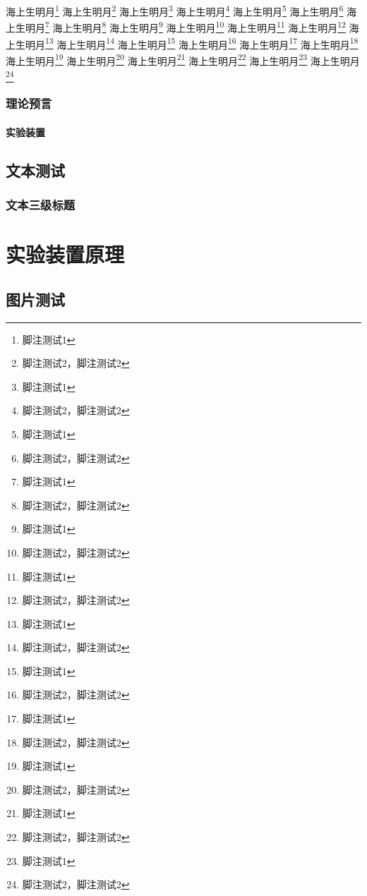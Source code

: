 \zhlipsum[2]
海上生明月\footnote{脚注测试1}
海上生明月\footnote{脚注测试2，脚注测试2}
海上生明月\footnote{脚注测试1}
海上生明月\footnote{脚注测试2，脚注测试2}
海上生明月\footnote{脚注测试1}
海上生明月\footnote{脚注测试2，脚注测试2}
海上生明月\footnote{脚注测试1}
海上生明月\footnote{脚注测试2，脚注测试2}
海上生明月\footnote{脚注测试1}
海上生明月\footnote{脚注测试2，脚注测试2}
海上生明月\footnote{脚注测试1}
海上生明月\footnote{脚注测试2，脚注测试2}
海上生明月\footnote{脚注测试1}
海上生明月\footnote{脚注测试2，脚注测试2}
海上生明月\footnote{脚注测试1}
海上生明月\footnote{脚注测试2，脚注测试2}
海上生明月\footnote{脚注测试1}
海上生明月\footnote{脚注测试2，脚注测试2}
海上生明月\footnote{脚注测试1}
海上生明月\footnote{脚注测试2，脚注测试2}
海上生明月\footnote{脚注测试1}
海上生明月\footnote{脚注测试2，脚注测试2}
海上生明月\footnote{脚注测试1}
海上生明月\footnote{脚注测试2，脚注测试2}

\subsection{理论预言}%



\zhlipsum[3]

\subsubsection{实验装置}%

\zhlipsum[4]


\section{文本测试}%



\zhlipsum[5]

\subsection{文本三级标题}%

\zhlipsum[6]



\chapter{实验装置原理}%


\section{图片测试}

